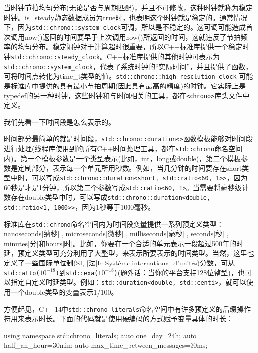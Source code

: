 当时钟节拍均匀分布(无论是否与周期匹配)，并且不可修改，这种时钟就称为稳定时钟。is\_steady静态数据成员为true时，也表明这个时钟就是稳定的。通常情况下，因为\texttt{std::chrono::system\_clock}可调，所以是不稳定的。这可调可能造成首次调用now()返回的时间要早于上次调用now()所返回的时间，这就违反了节拍频率的均匀分布。稳定闹钟对于计算超时很重要，所以C++标准库提供一个稳定时钟\texttt{std::chrono::steady\_clock}。C++标准库提供的其他时钟可表示为\texttt{std::chrono::system\_clock}，代表了系统时钟的“实际时间”，并且提供了函数，可将时间点转化为time\_t类型的值。\texttt{std::chrono::high\_resolution\_clock} 可能是标准库中提供的具有最小节拍周期(因此具有最高的精度)的时钟。它实际上是typedef的另一种时钟，这些时钟和与时间相关的工具，都在\texttt{<chrono>}库头文件中定义。

我们先看一下时间段是怎么表示的。


时间部分最简单的就是时间段，\texttt{std::chrono::duration<>}函数模板能够对时间段进行处理(线程库使用到的所有C++时间处理工具，都在\texttt{std::chrono}命名空间内)。第一个模板参数是一个类型表示(比如，int，long或double)，第二个模板参数是定制部分，表示每一个单元所用秒数。例如，当几分钟的时间要存在short类型中时，可以写成\texttt{std::chrono::duration<short, std::ratio<60, 1>>}，因为60秒是才是1分钟，所以第二个参数写成\texttt{std::ratio<60, 1>}。当需要将毫秒级计数存在double类型中时，可以写成\texttt{std::chrono::duration<double, std::ratio<1, 1000>>}，因为1秒等于1000毫秒。

标准库在\texttt{std::chrono}命名空间内为时间段变量提供一系列预定义类型：nanoseconds[纳秒] , microseconds[微秒] , milliseconds[毫秒] , seconds[秒] , minutes[分]和hours[时]。比如，你要在一个合适的单元表示一段超过500年的时延，预定义类型可充分利用了大整型，来表示所要表示的时间类型。当然，这里也定义了一些国际单位制(SI, [法]le Système international d'unités)分数，可从\texttt{std::atto(\(10^{-18}\))}到\texttt{std::exa(\(10^{-18}\))}(题外话：当你的平台支持128位整型)，也可以指定自定义时延类型。例如：\texttt{std::duration<double, std::centi>}，就可以使用一个double类型的变量表示1/100。

方便起见，C++14中\texttt{std::chrono\_literals}命名空间中有许多预定义的后缀操作符用来表示时长。下面的代码就是使用硬编码的方式赋予变量具体的时长：

\begin{cpp}
using namespace std::chrono_literals;
auto one_day=24h;
auto half_an_hour=30min;
auto max_time_between_messages=30ms;
\end{cpp}

